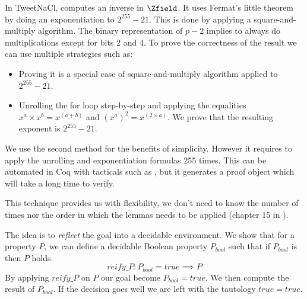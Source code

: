 In TweetNaCl,  computes an inverse in $\Zfield$.
It uses Fermat's little theorem by doing an exponentiation to $2^{255}-21$.
This is done by applying a square-and-multiply algorithm. The binary representation
of $p-2$ implies to always do multiplications except for bits 2 and 4.
To prove the correctness of the result we can use multiple strategies such as:
\begin{itemize}
  \item Proving it is a special case of square-and-multiply algorithm applied to $2^{255}-21$.
  \item Unrolling the for loop step-by-step and applying the equalities
  $x^a \times x^b = x^{(a+b)}$ and $(x^a)^2 = x^{(2 \times a)}$. We prove that
  the resulting exponent is $2^{255}-21$.
\end{itemize}
We use the second method for the benefits of simplicity. However it requires to
apply the unrolling and exponentiation formulas 255 times. This can be automated
in Coq with tacticals such as , but it generates a proof object which
will take a long time to verify.


 This technique provides us with
flexibility, \eg we don't need to know the number of times nor the order
in which the lemmas needs to be applied (chapter 15 in \cite{CpdtJFR}).

The idea is to \emph{reflect} the goal into a decidable environment.
We show that for a property $P$, we can define a decidable Boolean property
$P_{bool}$ such that if $P_{bool}$ is  then $P$ holds.
$$reify\_P : P_{bool} = true \implies P$$
By applying $reify\_P$ on $P$ our goal become $P_{bool} = true$.
We then compute the result of $P_{bool}$. If the decision goes well we are
left with the tautology $true = true$.

